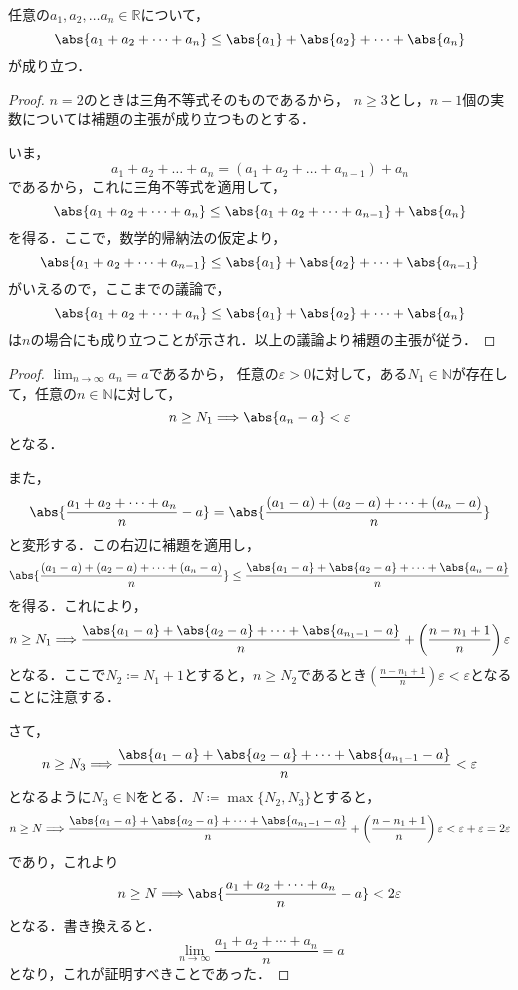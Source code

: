 \documentclass[uplatex,dvipdfmx,a4paper,10pt,fleqn]{jsarticle}
\begin{document}
    任意の$a_1 , a_2 , \dots a_n \in \mathbb{R}$について，
    \[
        \abs{a_1+a_2+\dots+a_n} \le \abs{a_1}+\abs{a_2}+\dots+\abs{a_n}
    \]
    が成り立つ．


\begin{proof}
    $n=2$のときは三角不等式そのものであるから，
    $n \ge 3$とし，$n-1$個の実数については補題の主張が成り立つものとする．

    いま，
    \[
        a_1 + a_2 + \dots + a_n = (a_1+a_2+\dots+a_{n-1})+a_n
    \]
    であるから，これに三角不等式を適用して，
    \[
        \abs{a_1+a_2+\dots+a_n} \le \abs{a_1+a_2+\dots+a_{n-1}} +\abs{a_n}
    \]
    を得る．ここで，数学的帰納法の仮定より，
    \[
        \abs{a_1+a_2+\dots+a_{n-1}} \le \abs{a_1}+\abs{a_2}+\dots+\abs{a_{n-1}}
    \]
    がいえるので，ここまでの議論で，
    \[
        \abs{a_1+a_2+\dots+a_n} \le \abs{a_1}+\abs{a_2}+\dots+\abs{a_n}
    \]
    は$n$の場合にも成り立つことが示され．以上の議論より補題の主張が従う．
\end{proof}

\begin{tleftbar}
    \begin{proof}
    $\lim_{n \to \infty} a_n =a$であるから，
    任意の$\varepsilon >0$に対して，ある$N_1 \in \mathbb{N}$が存在して，任意の$n \in \mathbb{N}$に対して，
    \[
        n \ge N_1 \Longrightarrow \abs{a_n -a}<\varepsilon 
    \]
    となる．

    また，
    \[
        \abs{\frac{a_1+a_2+\cdots+a_n}{n}-a}= \abs{\frac{(a_1-a)+(a_2-a)+\cdots+(a_n-a)}{n}}
    \]
    と変形する．この右辺に補題を適用し，
    \[
        \abs{\frac{(a_1-a)+(a_2-a)+\cdots+(a_n-a)}{n}} \le \frac{\abs{a_1-a}+\abs{a_2-a}+\cdots+\abs{a_n-a}}{n}
    \]
    を得る．これにより，
    \[
        n \ge N_1 \Longrightarrow \frac{\abs{a_1-a}+\abs{a_2-a}+\cdots+\abs{a_{n_1-1}-a}}{n} +\left( \frac{n-n_1+1}{n} \right ) \varepsilon 
    \]
    となる．ここで$N_2 \coloneqq N_1 +1$とすると，$n \ge N_2$であるとき$\left( \frac{n-n_1+1}{n} \right ) \varepsilon < \varepsilon$となることに注意する．
    
    さて，
    \[
        n \ge N_3 \Longrightarrow \frac{\abs{a_1-a}+\abs{a_2-a}+\cdots+\abs{a_{n_1-1}-a}}{n}<\varepsilon
    \]
    となるように$N_3 \in \mathbb{N}$をとる．$N \coloneqq \max \{ N_2 , N_3 \}$とすると，
    \[
        n \ge N \Longrightarrow \frac{\abs{a_1-a}+\abs{a_2-a}+\cdots+\abs{a_{n_1-1}-a}}{n} +\left( \frac{n-n_1+1}{n} \right ) \varepsilon < \varepsilon + \varepsilon = 2 \varepsilon
    \]
    であり，これより
    \[
        n \ge N \Longrightarrow \abs{\frac{a_1+a_2+\cdots+a_n}{n}-a} < 2 \varepsilon
    \]
    となる．書き換えると．
    \[
        \lim_{n \to \infty} \frac{a_1+a_2+\cdots+a_n}{n}=a
    \]
    となり，これが証明すべきことであった．
    \end{proof}
\end{tleftbar}
\end{document}

